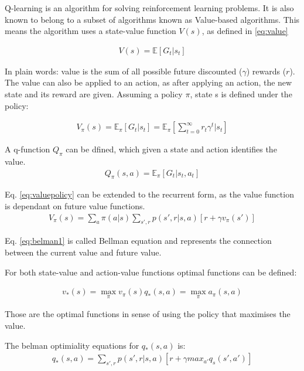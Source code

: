Q-learning is an algorithm for solving reinforcement learning problems.
It is also known to belong to a subset of algorithms known as Value-based algorithms.
This means the algorithm uses a state-value function $V(s)$, as defined in \ref{eq:value}

\begin{align}
  V(s) = \mathbb{E} \left[  G_{t} \bigg| s_{t} \right]
  \label{eq:value}
\end{align}

In plain words: value is the sum of all possible future discounted ($\gamma$) rewards ($r$).
The value can also be applied to an action, as after applying an action, the new state and its reward are given.
Assuming a policy $\pi$, state s is defined under the policy:

\begin{align}
  V_{\pi}(s) = \mathbb{E}_{\pi} \left[  G_{t} \bigg| s_{t} \right]=\mathbb{E}_{\pi} \left[  \sum_{t=0}^{\infty} r_{t}\gamma^{t} | s_{t} \right]
  \label{eq:valuepolicy}
\end{align}

A q-function $Q_{\pi}$ can be dfined, which given a state and action identifies the value.
\begin{align}
  Q_{\pi}(s,a) = \mathbb{E}_{\pi} \left[  G_{t} \bigg| s_{t}, a_{t} \right]
  \end{align}

Eq. \ref{eq:valuepolicy} can be extended to the recurrent form, as the value function is dependant on future value functions.
\begin{align}
V_{\pi}(s) = \sum_{a}\pi(a|s)\sum_{s',r}p(s',r|s,a)\left[r+ \gamma v_{\pi}(s')\right]
\label{eq:belman1}
\end{align}

Eq. \ref{eq:belman1} is called Bellman equation and represents the connection between the current value and future value.

For both state-value and action-value functions optimal functions can be defined:

\begin{align}
v_{*}(s) = \max_{\pi}v_{\pi}(s)
q_{*}(s,a) = \max_{\pi}a_{\pi}(s,a)
\label{eq:belman2}
\end{align}

Those are the optimal functions in sense of using the policy that maximises the value.

The belman optimiality equations for $q_{*}(s,a)$ is:
\begin{align}
q_{*}(s,a) = \sum_{s',r}p(s',r|s,a)\left[r+ \gamma max_{a'}q_{s}(s',a')\right]
\label{eq:belman3}
\end{align}

